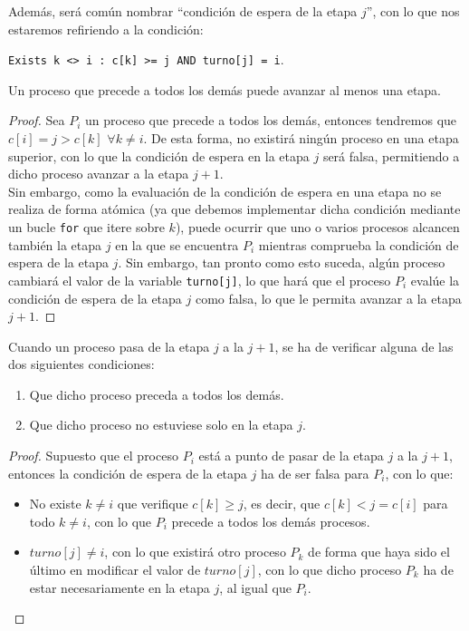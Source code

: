 Además, será común nombrar ``condición de espera de la etapa $j$'', con lo que nos estaremos refiriendo a la condición: 
\begin{center}
\verb|Exists k <> i : c[k] >= j AND turno[j] = i|.
\end{center}

\begin{lema}\label{lema:1}
    Un proceso que precede a todos los demás puede avanzar al menos una etapa.
    \begin{proof}
        Sea $P_i$ un proceso que precede a todos los demás, entonces tendremos que $c[i] = j > c[k]$ $\forall k \neq i$. De esta forma, no existirá ningún proceso en una etapa superior, con lo que la condición de espera en la etapa $j$ será falsa, permitiendo a dicho proceso avanzar a la etapa $j+1$.\\

        Sin embargo, como la evaluación de la condición de espera en una etapa no se realiza de forma atómica (ya que debemos implementar dicha condición mediante un bucle \verb|for| que itere sobre $k$), puede ocurrir que uno o varios procesos alcancen también la etapa $j$ en la que se encuentra $P_i$ mientras comprueba la condición de espera de la etapa $j$. Sin embargo, tan pronto como esto suceda, algún proceso cambiará el valor de la variable \verb|turno[j]|, lo que hará que el proceso $P_i$ evalúe la condición de espera de la etapa $j$ como falsa, lo que le permita avanzar a la etapa $j+1$.
    \end{proof}
\end{lema}

\begin{lema}\label{lema:2}
    Cuando un proceso pasa de la etapa $j$ a la $j+1$, se ha de verificar alguna de las dos siguientes condiciones:
    \begin{enumerate}[label=\alph*)]
        \item Que dicho proceso preceda a todos los demás.
        \item Que dicho proceso no estuviese solo en la etapa $j$.
    \end{enumerate}
    \begin{proof}
        Supuesto que el proceso $P_i$ está a punto de pasar de la etapa $j$ a la $j+1$, entonces la condición de espera de la etapa $j$ ha de ser falsa para $P_i$, con lo que:
        \begin{itemize}
            \item No existe $k \neq i$ que verifique $c[k]\geq j$, es decir, que $c[k] < j = c[i]$ para todo $k \neq i$, con lo que $P_i$ precede a todos los demás procesos.
            \item $turno[j] \neq i$, con lo que existirá otro proceso $P_k$ de forma que haya sido el último en modificar el valor de $turno[j]$, con lo que dicho proceso $P_k$ ha de estar necesariamente en la etapa $j$, al igual que $P_i$.
        \end{itemize}
    \end{proof}
\end{lema}

